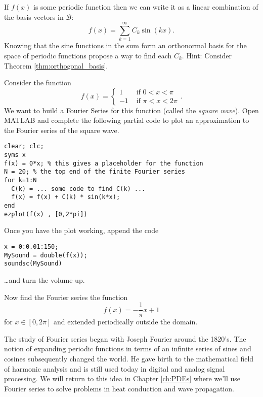 \begin{problem}
    If $f(x)$ is some periodic function then we can write it as a linear combination of
    the basis vectors in $\mathcal{B}$:
    \[ f(x) = \sum_{k=1}^{\infty} C_k \sin(k x). \]
    Knowing that the sine functions in the sum form an orthonormal basis for the space of
    periodic functions propose a way to find each $C_k$.  Hint: Consider Theorem
    \ref{thm:orthogonal_basis}.
\end{problem}

\begin{problem}
    Consider the function 
    \[ f(x) = \left\{ \begin{array}{cc} 1 & \text{ if } 0 < x < \pi \\ -1 & \text{ if }
            \pi < x < 2\pi \end{array} \right..\]
    We want to build a Fourier Series for this function (called the {\it square wave}).
    Open MATLAB and complete the following partial code to plot an approximation to the
    Fourier series of the square wave.
\begin{lstlisting}
clear; clc;
syms x
f(x) = 0*x; % this gives a placeholder for the function
N = 20; % the top end of the finite Fourier series
for k=1:N
  C(k) = ... some code to find C(k) ...
  f(x) = f(x) + C(k) * sin(k*x);
end
ezplot(f(x) , [0,2*pi])
\end{lstlisting}
Once you have the plot working, append the code
\begin{lstlisting}
x = 0:0.01:150;
MySound = double(f(x));
soundsc(MySound)
\end{lstlisting}
\ldots and turn the volume up.
\end{problem}

\begin{problem}
    Now find the Fourier series the function 
    \[ f(x) = -\frac{1}{\pi}x + 1 \]
    for $x \in [0,2\pi]$ and extended periodically outside the domain.
\end{problem}

The study of Fourier series began with Joseph Fourier around the 1820's.  The notion of
expanding periodic functions in terms of an infinite series of sines and cosines
subsequently changed the world.  He gave birth to the mathematical field of harmonic
analysis and is still used today in digital and analog signal processing.  We will return
to this idea in Chapter \ref{ch:PDEs} where we'll use Fourier series to solve problems in
heat conduction and wave propagation.  




